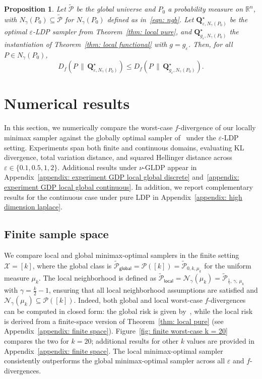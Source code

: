 \documentclass[accepted]{article}
\theoremstyle{plain} %
\newtheorem{proposition}[theorem]{Proposition}
\theoremstyle{definition}
\theoremstyle{remark}
\newcommand{\eps}{\varepsilon}
\newcommand{\bQ}{\mathbf{Q}}
\newcommand{\ngb}{N_\gamma(P_0)}
\begin{document}
\begin{proposition}\label{prop: pointwise}
Let \( \tilde{\mathcal{P}} \) be the global universe and \( P_0 \) a probability measure on \( \mathbb{R}^n \), with \( N_\gamma(P_0) \subseteq \tilde{\mathcal{P}} \) for $\ngb$ defined as in~\eqref{eqn: ngb}. Let \( \bQ^\star_{\varepsilon,\ngb} \) be the optimal $\eps$-LDP sampler from Theorem~\ref{thm: local pure}, and  \( \bQ^\star_{g_\varepsilon,\ngb} \) the instantiation of Theorem~\ref{thm: local functional} with \( g = g_\varepsilon \). Then, for all \( P \in N_\gamma(P_0) \),
\[
D_f(P \,\|\, \bQ^\star_{\varepsilon,\ngb}) \leq D_f(P \,\|\, \bQ^\star_{g_\varepsilon,\ngb}).
\]
\end{proposition}
\vspace{0.1cm}
\section{Numerical results}\label{sec: numeric}
\vspace{0.1cm}
In this section, we numerically compare the worst-case \( f \)-divergence of our locally minimax sampler against the globally optimal sampler of~\citep{park2024exactly} under the $\varepsilon$-LDP setting. Experiments span both finite and continuous domains, evaluating KL divergence, total variation distance, and squared Hellinger distance across \( \varepsilon \in \{0.1, 0.5, 1, 2\} \). Additional results under \( \nu \)-GLDP appear in Appendix~\ref{appendix: experiment GDP local global discrete} and~\ref{appendix: experiment GDP local global continuous}. In addition, we report complementary results for the continuous case under pure LDP in Appendix~\ref{appendix: high dimension laplace}.





\subsection{Finite sample space}\label{experiment: finite}

We compare local and global minimax-optimal samplers in the finite setting \( \mathcal{X} = [k] \), where the global class is \( \tilde{\mathcal{P}}_{\textsf{global}} = \mathcal{P}([k]) = \tilde{\mathcal{P}}_{0, k, \mu_k} \) for the uniform measure \( \mu_k \). The local neighborhood is defined as \( \tilde{\mathcal{P}}_{\textsf{local}} = \mathcal{N}_\gamma(\mu_k) = \tilde{\mathcal{P}}_{\frac{1}{\gamma},\, \gamma,\, \mu_k} \) with \( \gamma = \frac{k}{2} - 1 \), ensuring that all local neighborhood assumptions are satisfied and \( \mathcal{N}_\gamma(\mu_k) \subseteq \mathcal{P}([k]) \).
Indeed, both global and local worst-case \( f \)-divergences can be computed in closed form: the global risk is given by~\citep[Theorem 3.1]{park2024exactly}, while the local risk is derived from a finite-space version of Theorem~\ref{thm: local pure} (see Appendix~\ref{appendix: finite space}). Figure~\ref{fig: finite worst-case k = 20} compares the two for \( k = 20 \); additional results for other \( k \) values are provided in Appendix~\ref{appendix: finite space}. The local minimax-optimal sampler consistently outperforms the global minimax-optimal sampler across all \( \varepsilon \) and \( f \)-divergences.
\end{document}
